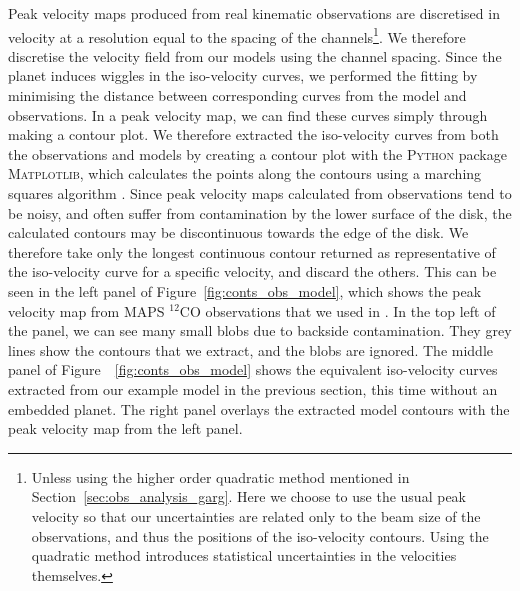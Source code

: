 Peak velocity maps produced from real kinematic observations are discretised in velocity at a resolution equal to the spacing of the channels\footnote{Unless using the higher order quadratic method mentioned in Section~\ref{sec:obs_analysis_garg}. Here we choose to use the usual peak velocity so that our uncertainties are related only to the beam size of the observations, and thus the positions of the iso-velocity contours. Using the quadratic method introduces statistical uncertainties in the velocities themselves.}.
We therefore discretise the velocity field from our models using the channel spacing.
Since the planet induces wiggles in the iso-velocity curves, we performed the fitting by minimising the distance between corresponding curves from the model and observations.
In a peak velocity map, we can find these curves simply through making a contour plot.
We therefore extracted the iso-velocity curves from both the observations and models by creating a contour plot with the \textsc{Python} package \textsc{Matplotlib}, which calculates the points along the contours using a marching squares algorithm \citep{hunter2007}.
Since peak velocity maps calculated from observations tend to be noisy, and often suffer from contamination by the lower surface of the disk, the calculated contours may be discontinuous towards the edge of the disk.
We therefore take only the longest continuous contour returned as representative of the iso-velocity curve for a specific velocity, and discard the others.
This can be seen in the left panel of Figure~\ref{fig:conts_obs_model}, which shows the peak velocity map from MAPS $^{12}$CO observations \citep{oberg2021} that we used in \citet{calcino2022}.
In the top left of the panel, we can see many small blobs due to backside contamination.
They grey lines show the contours that we extract, and the blobs are ignored.
The middle panel of Figure~~\ref{fig:conts_obs_model} shows the equivalent iso-velocity curves extracted from our example model in the previous section, this time without an embedded planet.
The right panel overlays the extracted model contours with the peak velocity map from the left panel.

